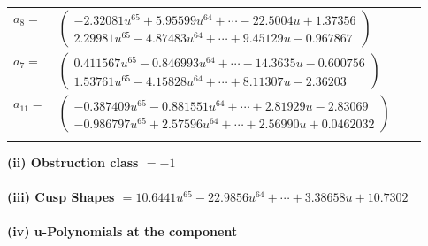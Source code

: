 \documentclass[1p]{elsarticle_modified}
\theoremstyle{definition}
\begin{document}
\begin{tabular}{m{7pt} m{180pt} m{7pt} m{180pt} }
\flushright $a_{8}=$&$\begin{pmatrix}-2.32081 u^{65}+5.95599 u^{64}+\cdots-22.5004 u+1.37356\\2.29981 u^{65}-4.87483 u^{64}+\cdots+9.45129 u-0.967867\end{pmatrix}$ \\
\flushright $a_{7}=$&$\begin{pmatrix}0.411567 u^{65}-0.846993 u^{64}+\cdots-14.3635 u-0.600756\\1.53761 u^{65}-4.15828 u^{64}+\cdots+8.11307 u-2.36203\end{pmatrix}$ \\
\flushright $a_{11}=$&$\begin{pmatrix}-0.387409 u^{65}-0.881551 u^{64}+\cdots+2.81929 u-2.83069\\-0.986797 u^{65}+2.57596 u^{64}+\cdots+2.56990 u+0.0462032\end{pmatrix}$\\&\end{tabular}
\flushleft \textbf{(ii) Obstruction class $= -1$}\\~\\
\flushleft \textbf{(iii) Cusp Shapes $= 10.6441 u^{65}-22.9856 u^{64}+\cdots+3.38658 u+10.7302$}\\~\\
\newpage\renewcommand{\arraystretch}{1}
\flushleft \textbf{(iv) u-Polynomials at the component}\newline \\
\end{document}
